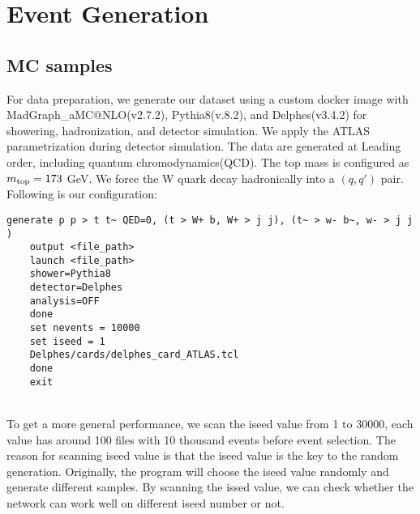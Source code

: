 \chapter{Event Generation}\label{Event Generation}



\section{MC samples}\label{sec:MC sample}
For data preparation, we generate our dataset using a custom docker image with MadGraph\_aMC@NLO(v2.7.2), Pythia8(v.8.2), and Delphes(v3.4.2) for showering, hadronization, and detector simulation. We apply the ATLAS parametrization during detector simulation.  The data are generated at Leading order, including quantum chromodynamics(QCD). The top mass is configured as $m_{\rm top}=173$ GeV. We force the W quark decay hadronically into a $(q, q')$ pair. Following is our configuration:
\\
\begin{adjustbox}{max width=\textwidth}
\centering
\begin{lstlisting}[caption={Configuration for generating samples},captionpos=b]
	generate p p > t t~ QED=0, (t > W+ b, W+ > j j), (t~ > w- b~, w- > j j ) 
	output <file_path> 
	launch <file_path> 
	shower=Pythia8  
	detector=Delphes 
	analysis=OFF 
	done  
	set nevents = 10000 
	set iseed = 1 
	Delphes/cards/delphes_card_ATLAS.tcl
	done 
	exit 
\end{lstlisting}
\end{adjustbox}
\\
To get a more general performance, we scan the iseed value from 1 to 30000, each value has around 100 files with 10 thousand events before event selection. The reason for scanning iseed value is that the iseed value is the key to the random generation. Originally, the program will choose the iseed value randomly and generate different samples. By scanning the issed value, we can check whether the network can work well on different iseed number or not.





